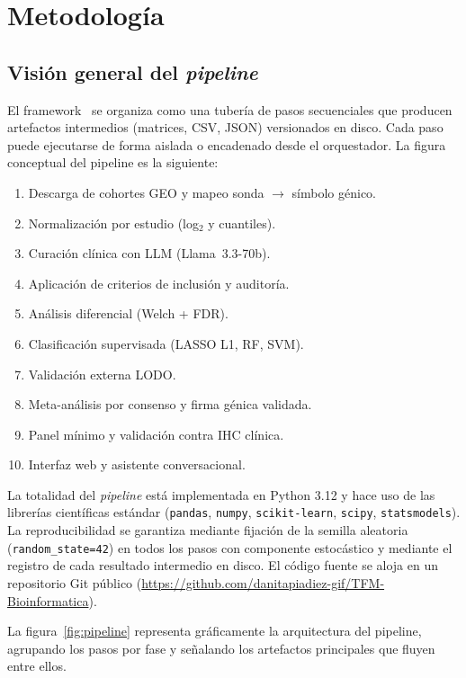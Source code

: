 \chapter{Metodología}
\label{cap:metodos}

\section{Visión general del \emph{pipeline}}
\label{sec:pipeline_overview}

El framework \framework\ se organiza como una tubería de pasos secuenciales
que producen artefactos intermedios (matrices, CSV, JSON) versionados en
disco. Cada paso puede ejecutarse de forma aislada o encadenado desde el
orquestador. La figura conceptual del pipeline es la siguiente:

\begin{enumerate}
  \item Descarga de cohortes GEO y mapeo sonda $\to$ símbolo génico.
  \item Normalización por estudio (log$_2$ y cuantiles).
  \item Curación clínica con LLM (Llama~3.3-70b).
  \item Aplicación de criterios de inclusión y auditoría.
  \item Análisis diferencial (Welch + FDR).
  \item Clasificación supervisada (LASSO L1, RF, SVM).
  \item Validación externa LODO.
  \item Meta-análisis por consenso y firma génica validada.
  \item Panel mínimo y validación contra IHC clínica.
  \item Interfaz web y asistente conversacional.
\end{enumerate}

La totalidad del \emph{pipeline} está implementada en Python 3.12 y hace
uso de las librerías científicas estándar (\texttt{pandas}, \texttt{numpy},
\texttt{scikit-learn}, \texttt{scipy}, \texttt{statsmodels}). La
reproducibilidad se garantiza mediante fijación de la semilla aleatoria
(\texttt{random\_state=42}) en todos los pasos con componente estocástico
y mediante el registro de cada resultado intermedio en disco. El código
fuente se aloja en un repositorio Git público
(\url{https://github.com/danitapiadiez-gif/TFM-Bioinformatica}).

La figura~\ref{fig:pipeline} representa gráficamente la arquitectura del
pipeline, agrupando los pasos por fase y señalando los artefactos
principales que fluyen entre ellos.

